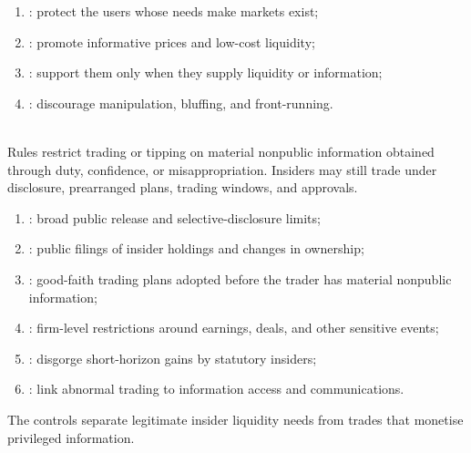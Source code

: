 \documentclass[a4paper,oneside,openany]{book}
\begin{document}
\begin{taxonomy} 
\begin{enumerate}[label=\roman*.]
\setlength{\itemsep}{0pt}
\item {}: protect the users whose needs make markets exist;
\item {}: promote informative prices and low-cost liquidity;
\item {}: support them only when they supply liquidity or information;
\item {}: discourage manipulation, bluffing, and front-running.
\end{enumerate}
\end{taxonomy}

\begin{marketrule} \\
Rules restrict trading or tipping on material nonpublic information obtained through duty, confidence, or misappropriation. Insiders may still trade under disclosure, prearranged plans, trading windows, and approvals.
\end{marketrule}

\begin{taxonomy} 
\begin{enumerate}[label=\roman*.]
\setlength{\itemsep}{0pt}
\item {}: broad public release and selective-disclosure limits;
\item {}: public filings of insider holdings and changes in ownership;
\item {}: good-faith trading plans adopted before the trader has material nonpublic information;
\item {}: firm-level restrictions around earnings, deals, and other sensitive events;
\item {}: disgorge short-horizon gains by statutory insiders;
\item {}: link abnormal trading to information access and communications.
\end{enumerate}
The controls separate legitimate insider liquidity needs from trades that monetise privileged information.
\end{taxonomy}
\end{document}
